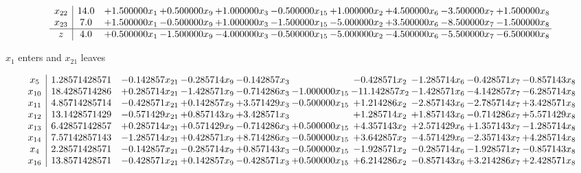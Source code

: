 \documentclass[10pt]{article}
\begin{document}
\[\begin{array}{c| c c@{\hskip 2pt} c@{\hskip 2pt} c@{\hskip 2pt} c@{\hskip 2pt} c@{\hskip 2pt} c@{\hskip 2pt} c@{\hskip 2pt} c@{\hskip 2pt} }
 x_{22}   &  14.0 & + 1.500000 x_{1} & + 0.500000 x_{9} & + 1.000000 x_{3} & -0.500000 x_{15} & + 1.000000 x_{2} & + 4.500000 x_{6} & -3.500000 x_{7} & + 1.500000 x_{8}\\
 x_{23}   &  7.0 & + 1.500000 x_{1} & -0.500000 x_{9} & + 1.000000 x_{3} & -1.500000 x_{15} & -5.000000 x_{2} & + 3.500000 x_{6} & -8.500000 x_{7} & -1.500000 x_{8}\\
\hline
z    &  4.0 & + 0.500000 x_{1} & -1.500000 x_{9} & -4.000000 x_{3} & -0.500000 x_{15} & -5.000000 x_{2} & -4.500000 x_{6} & -5.500000 x_{7} & -6.500000 x_{8}\\
\end{array}\]


 $ x_{1} $ enters and $ x_{21} $ leaves 

 \[\begin{array}{c| c c@{\hskip 2pt} c@{\hskip 2pt} c@{\hskip 2pt} c@{\hskip 2pt} c@{\hskip 2pt} c@{\hskip 2pt} c@{\hskip 2pt} c@{\hskip 2pt} }
 x_{5}   &  1.28571428571 & -0.142857 x_{21} & -0.285714 x_{9} & -0.142857 x_{3} &   & -0.428571 x_{2} & -1.285714 x_{6} & -0.428571 x_{7} & -0.857143 x_{8}\\
 x_{10}   &  18.4285714286 & + 0.285714 x_{21} & -1.428571 x_{9} & -0.714286 x_{3} & -1.000000 x_{15} & -11.142857 x_{2} & -1.428571 x_{6} & -4.142857 x_{7} & -6.285714 x_{8}\\
 x_{11}   &  4.85714285714 & -0.428571 x_{21} & + 0.142857 x_{9} & + 3.571429 x_{3} & -0.500000 x_{15} & + 1.214286 x_{2} & -2.857143 x_{6} & -2.785714 x_{7} & + 3.428571 x_{8}\\
 x_{12}   &  13.1428571429 & -0.571429 x_{21} & + 0.857143 x_{9} & + 3.428571 x_{3} &   & + 1.285714 x_{2} & + 1.857143 x_{6} & -0.714286 x_{7} & + 5.571429 x_{8}\\
 x_{13}   &  6.42857142857 & + 0.285714 x_{21} & + 0.571429 x_{9} & -0.714286 x_{3} & + 0.500000 x_{15} & + 4.357143 x_{2} & + 2.571429 x_{6} & + 1.357143 x_{7} & -1.285714 x_{8}\\
 x_{14}   &  7.57142857143 & -1.285714 x_{21} & + 0.428571 x_{9} & + 8.714286 x_{3} & -0.500000 x_{15} & + 3.642857 x_{2} & -4.571429 x_{6} & -2.357143 x_{7} & + 4.285714 x_{8}\\
 x_{4}   &  2.28571428571 & -0.142857 x_{21} & -0.285714 x_{9} & + 0.857143 x_{3} & -0.500000 x_{15} & -1.928571 x_{2} & -0.285714 x_{6} & -1.928571 x_{7} & -0.857143 x_{8}\\
 x_{16}   &  13.8571428571 & -0.428571 x_{21} & + 0.142857 x_{9} & -0.428571 x_{3} & + 0.500000 x_{15} & + 6.214286 x_{2} & -0.857143 x_{6} & + 3.214286 x_{7} & + 2.428571 x_{8}\\

\end{array}\]
\end{document}
